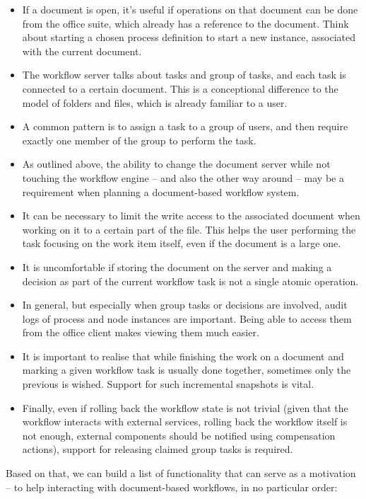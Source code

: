 \begin{itemize}
\item If a document is open, it's useful if operations on
that document can be done from the office suite, which already has a reference
to the document. Think about starting a chosen process definition to start a
new instance, associated with the current document.
\item The workflow server talks about tasks and group of tasks, and each task
is connected to a certain document. This is a conceptional difference to the model of
folders and files, which is already familiar to a user.
\item A common pattern is to assign a task to a group of users, and then
require exactly one member of the group to perform the task.
\item As outlined above, the ability to change the document server while not
touching the workflow engine -- and also the other way around -- may be a
requirement when planning a document-based workflow system.
\item It can be necessary to limit the write access to the associated document
when working on it to a certain part of the file. This helps the user
performing the task focusing on the work item itself, even if the document is a
large one.
\item It is uncomfortable if storing the document on the server and making a
decision as part of the current workflow task is not a single atomic operation.
\item In general, but especially when group tasks or decisions are involved, audit logs of
process and node instances are important. Being able to access them from the office client
makes viewing them much easier.
\item It is important to realise that while finishing the work on a document
and marking a given workflow task is usually done together, sometimes only the
previous is wished. Support for such incremental snapshots is vital.
\item Finally, even if rolling back the workflow state is not trivial (given
that the workflow interacts with external services, rolling back the workflow
itself is not enough, external components should be notified using compensation
actions), support for releasing claimed group tasks is required.
\end{itemize}

Based on that, we can build a list of functionality that can serve as a
motivation -- to help interacting with document-based workflows, in no
particular order:

